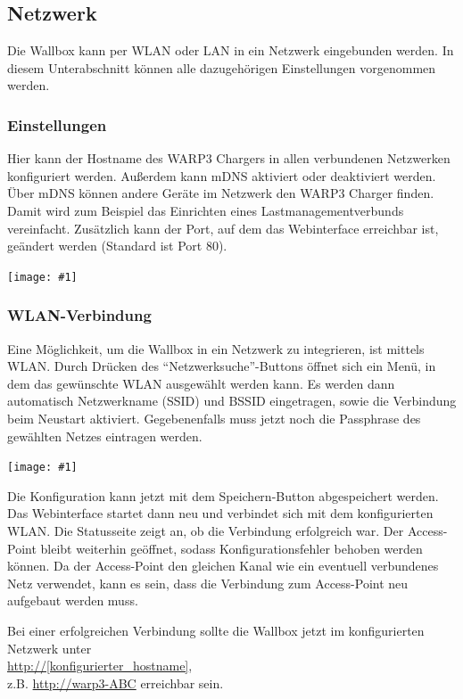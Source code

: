 \documentclass[a4paper,10pt]{article}
\newcommand{\gfx}[1]{\texttt{[image: \#1]}}
\begin{document}
\begin{multicols*}{2}
    \subsection{Netzwerk}\label{network}
    Die Wallbox kann per WLAN oder LAN in ein Netzwerk eingebunden werden.
    In diesem Unterabschnitt können alle dazugehörigen Einstellungen vorgenommen werden.

    \subsubsection{Einstellungen}
    Hier kann der Hostname des WARP3 Chargers in allen verbundenen Netzwerken konfiguriert werden. Außerdem kann mDNS aktiviert oder deaktiviert werden.
    Über mDNS können andere Geräte im Netzwerk den WARP3 Charger finden. Damit
    wird zum Beispiel das Einrichten eines Lastmanagementverbunds vereinfacht.
    Zusätzlich kann der Port, auf dem das Webinterface erreichbar ist, geändert werden (Standard ist
    Port 80).

    \gfx{./img_warp3/resized/web_network}


    \subsubsection{WLAN-Verbindung}
    Eine Möglichkeit, um die Wallbox in ein Netzwerk zu integrieren, ist mittels WLAN.
    Durch Drücken des \enquote{Netzwerksuche}-Buttons öffnet sich ein Menü, in dem das gewünschte WLAN ausgewählt werden kann.
    Es werden dann automatisch Netzwerkname (SSID) und BSSID eingetragen, sowie die Verbindung beim Neustart aktiviert.
    Gegebenenfalls muss jetzt noch die Passphrase des gewählten Netzes eintragen
	werden.

    \gfx{./img_warp3/resized/web_wifi_sta}

    Die Konfiguration kann jetzt mit dem Speichern-Button abgespeichert werden.
    Das Webinterface startet dann neu und verbindet sich mit dem konfigurierten WLAN. Die Statusseite zeigt
    an, ob die Verbindung erfolgreich war. Der Access-Point bleibt weiterhin
    geöffnet, sodass Konfigurationsfehler behoben werden können.
    Da der Access-Point den gleichen Kanal wie ein eventuell verbundenes Netz verwendet,
    kann es sein, dass die Verbindung zum Access-Point neu aufgebaut werden muss.

    Bei einer erfolgreichen Verbindung sollte die Wallbox jetzt im konfigurierten Netzwerk unter\\
    \url{http://[konfigurierter_hostname]},\\ z.B. \url{http://warp3-ABC} erreichbar sein.


\end{multicols*}
\end{document}
